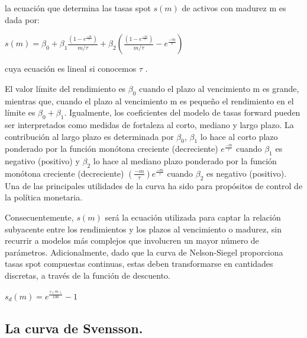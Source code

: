 \noindent la ecuaci\'on que determina las tasas spot $s(m)$ de activos con madurez m es dada por:

\vspace*{0.2 cm}


\begin{center}
$\displaystyle{s(m) = \beta_{0}+ \beta_{1}\frac{\left(1-e^\frac{-m}{\tau}\right)}{m/\tau} + \beta_{2} \left(\frac{\left(1-e^\frac{-m}{\tau}\right)}{m/\tau} -  e^\frac{-m}{\tau}\right)}$
\end{center}

\vspace*{0.2 cm}

\noindent cuya ecuaci\'on es lineal si conocemos $\tau$ .

\hspace*{0.4 cm} El valor l\'imite del rendimiento es $\beta_{0}$ cuando el plazo al vencimiento m es grande, mientras que, cuando el plazo al vencimiento m es peque\~no el
rendimiento en el l\'imite es $\beta_{0}+\beta_{1}$. Igualmente, los coeficientes del
modelo de tasas forward pueden ser interpretados como medidas de
fortaleza al corto, mediano y largo plazo. La contribuci\'on al largo plazo
es determinada por $\beta_{0}$, $\beta_{1}$ lo hace al corto plazo ponderado por la
funci\'on mon\'otona creciente (decreciente) $e^{\frac{-m}{\tau}}$ cuando $\beta_{1}$ es negativo
(positivo) y $\beta_{2}$ lo hace al mediano plazo ponderado por la funci\'on
mon\'otona creciente (decreciente) $(\frac{-m}{\tau}) e^{\frac{-m}{\tau}}$ cuando $\beta_{2}$ es negativo
(positivo). Una de las principales utilidades de la curva ha sido para
prop\'ositos de control de la pol\'itica monetaria.

\hspace*{0.4 cm} Consecuentemente, $s(m)$ ser\'a la ecuaci\'on utilizada para captar la relaci\'on
subyacente entre los rendimientos y los plazos al vencimiento o madurez,
sin recurrir a modelos m\'as complejos que involucren un mayor n\'umero
de par\'ametros. Adicionalmente, dado que la curva de Nelson-Siegel
proporciona tasas spot compuestas continuas, estas deben transformarse
en cantidades discretas, a trav\'es de la funci\'on de descuento.


\begin{center}
$\displaystyle{s_{d}(m) = e^{\frac{s(m)}{100}} - 1}$
\end{center}

\subsection{La curva de Svensson.\\}

